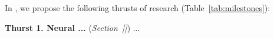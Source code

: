 In {\tool}, we propose the following thrusts of research
(Table~\ref{tab:milestones}):

\vspace{3pt}
\noindent \textbf{Thurst 1. Neural ...} ({\em Section~\ref{}}) ...





